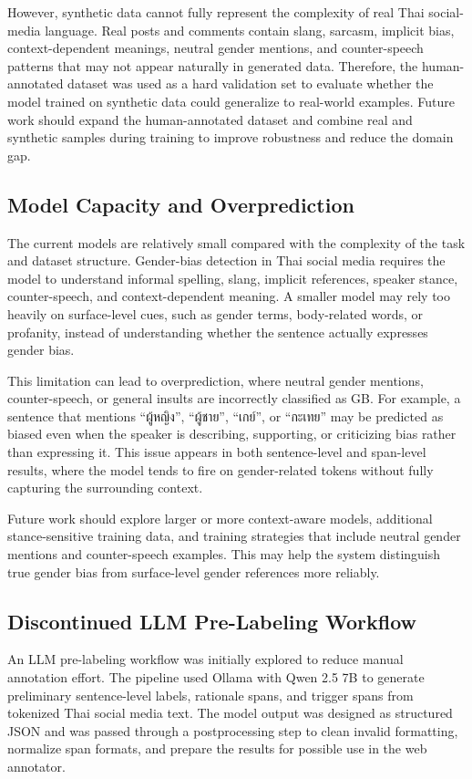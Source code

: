 \documentclass[12pt,oneside,openright,a4paper]{cpe-english-project}
\begin{document}
However, synthetic data cannot fully represent the complexity of real Thai social-media language. Real posts and comments contain slang, sarcasm, implicit bias, context-dependent meanings, neutral gender mentions, and counter-speech patterns that may not appear naturally in generated data. Therefore, the human-annotated dataset was used as a hard validation set to evaluate whether the model trained on synthetic data could generalize to real-world examples. Future work should expand the human-annotated dataset and combine real and synthetic samples during training to improve robustness and reduce the domain gap.

\subsection{Model Capacity and Overprediction}

The current models are relatively small compared with the complexity of the task and dataset structure. Gender-bias detection in Thai social media requires the model to understand informal spelling, slang, implicit references, speaker stance, counter-speech, and context-dependent meaning. A smaller model may rely too heavily on surface-level cues, such as gender terms, body-related words, or profanity, instead of understanding whether the sentence actually expresses gender bias.

This limitation can lead to overprediction, where neutral gender mentions, counter-speech, or general insults are incorrectly classified as GB. For example, a sentence that mentions ``ผู้หญิง'', ``ผู้ชาย'', ``เกย์'', or ``กะเทย'' may be predicted as biased even when the speaker is describing, supporting, or criticizing bias rather than expressing it. This issue appears in both sentence-level and span-level results, where the model tends to fire on gender-related tokens without fully capturing the surrounding context.

Future work should explore larger or more context-aware models, additional stance-sensitive training data, and training strategies that include neutral gender mentions and counter-speech examples. This may help the system distinguish true gender bias from surface-level gender references more reliably.

\subsection{Discontinued LLM Pre-Labeling Workflow}

An LLM pre-labeling workflow was initially explored to reduce manual annotation effort. The pipeline used Ollama with Qwen 2.5 7B to generate preliminary sentence-level labels, rationale spans, and trigger spans from tokenized Thai social media text. The model output was designed as structured JSON and was passed through a postprocessing step to clean invalid formatting, normalize span formats, and prepare the results for possible use in the web annotator.
\end{document}
